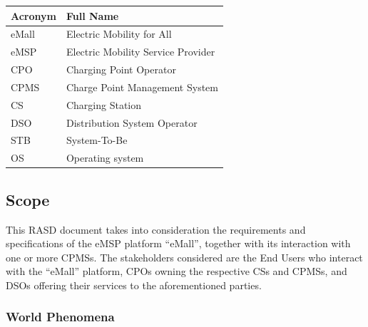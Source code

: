 \documentclass[11pt]{article}
\begin{document}
\begin{table}[H]
    \centering
    \setlength{\tabcolsep}{18pt}
    \renewcommand{\arraystretch}{1.2}
    \begin{tabularx}{\textwidth}{|>{\centering\hsize=0.3\hsize}X|>{\hsize=1.7\hsize}X|}
        \hline
        \textbf{Acronym} & \textbf{Full Name} \\
        \hline
        eMall & Electric Mobility for All \\
        \hline
        eMSP & Electric Mobility Service Provider \\
        \hline
        CPO & Charging Point Operator \\
        \hline
        CPMS & Charge Point Management System \\
        \hline
        CS & Charging Station \\
        \hline
        DSO & Distribution System Operator \\
        \hline
        STB & System-To-Be \\
        \hline
        OS & Operating system \\
        \hline
    \end{tabularx}
    \label{tab:acronyms}
\end{table}

\subsection{Scope}

This RASD document takes into consideration the requirements and specifications of the eMSP platform “eMall”, together with its interaction with one or more CPMSs. The stakeholders considered are the End Users who interact with the “eMall” platform, CPOs owning the respective CSs and CPMSs, and DSOs offering their services to the aforementioned parties.

\subsubsection{World Phenomena}
\end{document}
